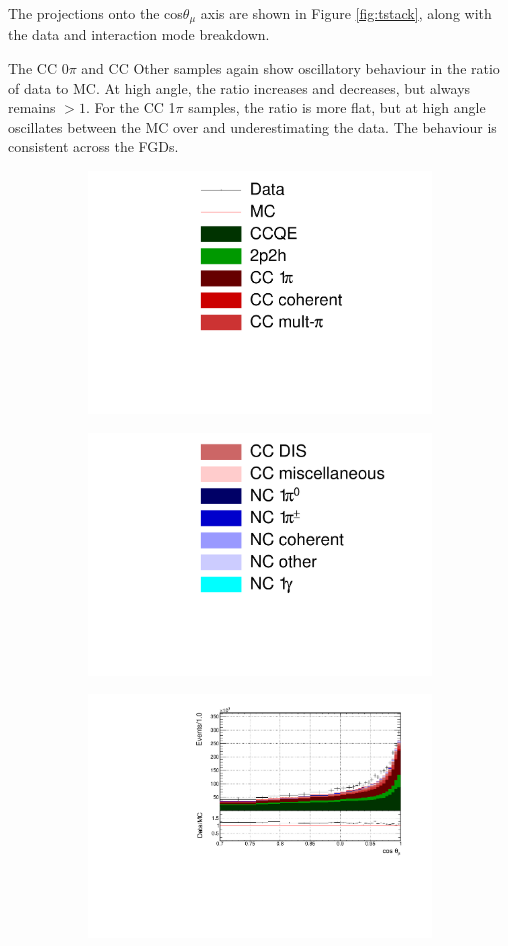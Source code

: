 The projections onto the cos$\theta_{\mu}$ axis are shown in Figure \ref{fig:tstack}, along with the data and interaction mode breakdown.

The CC 0$\pi$ and CC Other samples again show oscillatory behaviour in the ratio of data to MC. At high angle, the ratio increases and decreases, but always remains $>1$. For the CC 1$\pi$ samples,  the ratio is more flat, but at high angle oscillates between the MC over and underestimating the data. The behaviour is consistent across the FGDs.

\begin{figure}
\centering
\begin{subfigure}{.35\textwidth}
  \centering
  \includegraphics[width=0.7\linewidth]{figs/legend}
\end{subfigure}
\begin{subfigure}{.35\textwidth}
  \centering
  \includegraphics[width=0.7\linewidth]{figs/legend2}
\end{subfigure}
\begin{subfigure}{.32\textwidth}
  \centering
  \includegraphics[width=0.95\linewidth]{figs/FGD1_numuCC_0pi_t}

\end{subfigure}
\end{figure}
